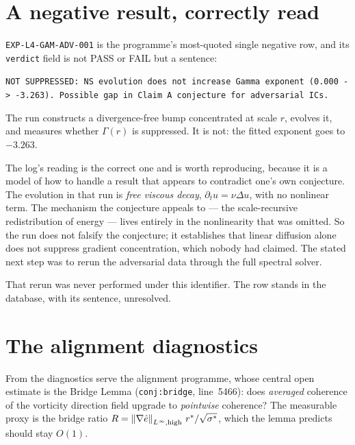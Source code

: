 \section{A negative result, correctly read}
\label{sec:gamma-negative}

\texttt{EXP-L4-GAM-ADV-001} is the programme's most-quoted single negative
row, and its \texttt{verdict} field is not \textsf{PASS} or \textsf{FAIL} but
a sentence:

\begin{record}
\texttt{NOT SUPPRESSED: NS evolution does not increase Gamma exponent
(0.000 -> -3.263). Possible gap in Claim A conjecture for adversarial ICs.}
\end{record}

The run constructs a divergence-free bump concentrated at scale \(r\),
evolves it, and measures whether \(\Gamma(r)\) is suppressed. It is not: the
fitted exponent goes to \(-3.263\).

The  log's reading is the correct one and is worth reproducing,
because it is a model of how to handle a result that appears to contradict
one's own conjecture. The evolution in that run is \emph{free viscous decay},
\(\partial_tu=\nu\Delta u\), with no nonlinear term. The mechanism the
conjecture appeals to --- the scale-recursive redistribution of energy ---
lives entirely in the nonlinearity that was omitted. So the run does not
falsify the conjecture; it establishes that linear diffusion alone does not
suppress gradient concentration, which nobody had claimed. The stated next
step was to rerun the adversarial data through the full spectral solver.

That rerun was never performed under this identifier. The row stands in the
database, with its sentence, unresolved.

\section{The alignment diagnostics}
\label{sec:alignment-diagnostics}

From  the diagnostics serve the alignment programme, whose central
open estimate is the Bridge Lemma (\texttt{conj:bridge}, line~5466): does
\emph{averaged} coherence of the vorticity direction field upgrade to
\emph{pointwise} coherence? The measurable proxy is the bridge ratio
\(R=\left\|\nabla\hat{e}\right\|_{L^\infty,\mathrm{high}}\,r^{*}/\sqrt{\sigma^{*}}\), which
the lemma predicts should stay \(O(1)\).

